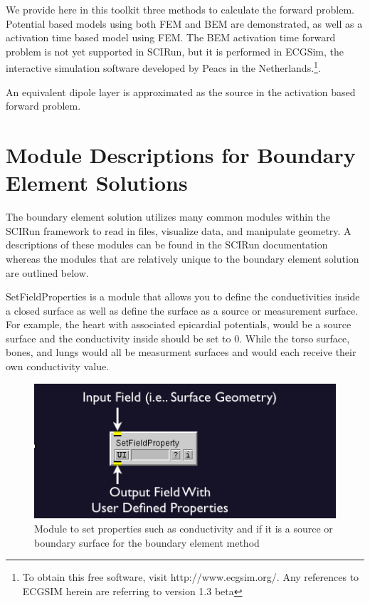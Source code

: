 We provide here in this toolkit three methods to calculate the forward problem.  Potential based models using both FEM and BEM are demonstrated, as well as a activation time based model using FEM.  The BEM activation time forward problem is not yet supported in SCIRun, but it is performed in ECGSim, the interactive simulation software developed by Peacs in the Netherlands.\footnote{To obtain this free software, visit http://www.ecgsim.org/. Any references to ECGSIM herein are referring to version 1.3 beta}.  


An equivalent dipole layer is approximated as the source in the activation based forward problem.  


\section{Module Descriptions for Boundary Element Solutions}
The boundary element solution utilizes many common modules within the SCIRun framework
to read in files, visualize data, and manipulate geometry.  A descriptions of these modules
can be found in the SCIRun documentation whereas the modules that are relatively unique to the boundary element solution are outlined below.

SetFieldProperties is a module that allows you to define the conductivities inside a closed
surface as well as define the surface as a source or measurement surface.  For example, the heart with associated epicardial potentials, would be a source surface and the conductivity inside should
be set to 0.  While the torso surface, bones, and lungs would all be measurment surfaces and would 
each receive their own conductivity value.

\begin{figure}[H]
\begin{center}
\includegraphics[width=12 cm]{ECGToolkitGuide_figures/SetFieldProps.png}
\caption{Module to set properties such as conductivity and if it is a source or boundary surface for the boundary element method}
\label{SetFieldProp}
\end{center}
\end{figure}

